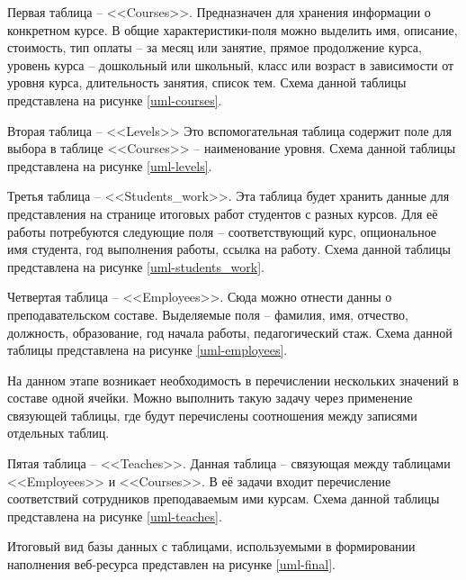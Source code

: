 Первая таблица -- <<Courses>>.
Предназначен для хранения информации о конкретном курсе.
В общие характеристики-поля можно выделить имя, описание, стоимость, тип оплаты -- за месяц или занятие, прямое продолжение курса, уровень курса -- дошкольный или школьный, класс или возраст в зависимости от уровня курса, длительность занятия, список тем.
Схема данной таблицы представлена на рисунке \ref{uml-courses}.


Вторая таблица -- <<Levels>>
Это вспомогательная таблица содержит поле для выбора в таблице <<Courses>> -- наименование уровня.
Схема данной таблицы представлена на рисунке \ref{uml-levels}.


Третья таблица -- <<Students\_work>>.
Эта таблица будет хранить данные для представления на странице итоговых работ студентов с разных курсов.
Для её работы потребуются следующие поля -- соответствующий курс, опциональное имя студента, год выполнения работы, ссылка на работу.
Схема данной таблицы представлена на рисунке \ref{uml-students_work}.


Четвертая таблица -- <<Employees>>.
Сюда можно отнести данны о преподавательском составе.
Выделяемые поля -- фамилия, имя, отчество, должность, образование, год начала работы, педагогический стаж.
Схема данной таблицы представлена на рисунке \ref{uml-employees}.


На данном этапе возникает необходимость в перечислении нескольких значений в составе одной ячейки.
Можно выполнить такую задачу через применение связующей таблицы, где будут перечислены соотношения между записями отдельных таблиц.

Пятая таблица -- <<Teaches>>.
Данная таблица -- связующая между таблицами <<Employees>> и <<Courses>>.
В её задачи входит перечисление соответствий сотрудников преподаваемым ими курсам.
Схема данной таблицы представлена на рисунке \ref{uml-teaches}.


Итоговый вид базы данных с таблицами, используемыми в формировании наполнения веб-ресурса представлен на рисунке \ref{uml-final}.

